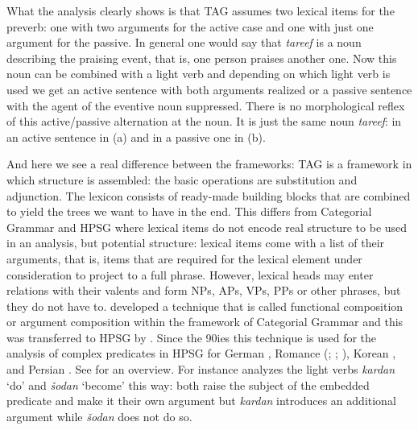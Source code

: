 What the analysis clearly shows is that TAG assumes two lexical items for the preverb: one with two
arguments for the active case and one with just one argument
for the passive. In general one would
say that \emph{tareef} is a noun describing the praising event, that is, one 
person praises another one. Now this noun can be combined with a light verb and depending on which
light verb is used we get an active sentence with both arguments realized or a passive sentence with
the agent of the eventive noun suppressed. There is no morphological reflex of this active/passive
alternation at the noun. It is just the same noun \emph{tareef}: in an active sentence in (a)
and in a passive one in (b).

And here we see a real difference between the frameworks: TAG is a framework in which structure is
assembled: the basic operations are substitution and adjunction. The lexicon consists of ready-made
building blocks that are combined to yield the trees we want to have in the end. This differs from
Categorial Grammar %
and HPSG %
where lexical items do not
encode real structure to be used in an analysis, but potential structure: lexical items come with a
list of their arguments, that is, items that are required for the lexical element under
consideration to project to a full phrase. However, lexical heads may enter
relations with their valents and form NPs, APs, VPs, PPs or other phrases, but they do not have
to. \citet{Geach70a} developed a technique that is called functional composition or argument
composition within the framework of Categorial Grammar and this was transferred to HPSG by
\citet{HN89a,HN94a}. Since the 90ies this technique is used for the analysis of complex predicates
in HPSG for German \citep{HN89a,HN94a,Kiss95a,Meurers99a,Mueller99a,Kathol2000a},
Romance (\citealp[]{MS97a-u}; \citealp{Monachesi98a}; \citealp{AG2002b-u}),
Korean \citep{Chung98a-u}, and Persian \citep{MuellerPersian}. See  for
an overview. For instance \citet[]{MuellerPersian} analyzes the light verbs \emph{kardan} `do' and \emph{šodan} `become' this
way: both raise the subject of the embedded predicate and make it their own argument but
\emph{kardan} introduces an additional argument while \emph{šodan} does not do so.

